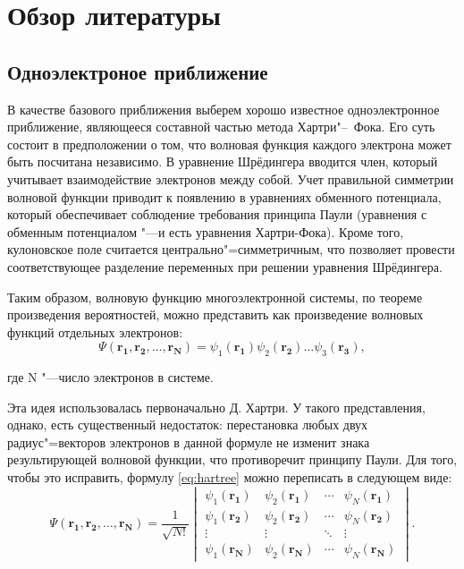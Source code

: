 \chapter{\textbf{Обзор литературы}}\label{ch:literature}
\section{\textbf{Одноэлектроное приближение}}
В качестве базового приближения выберем хорошо известное одноэлектронное приближение, являющееся составной частью
метода Хартри"--~Фока\cite{Hartree}. Его суть состоит в предположении о том, что волновая функция каждого электрона
может быть посчитана независимо.
В уравнение Шрёдингера вводится член, который учитывает взаимодействие электронов между
собой. Учет правильной симметрии волновой функции приводит к появлению в уравнениях
обменного потенциала, который обеспечивает соблюдение требования принципа Паули
(уравнения с обменным потенциалом "---и есть уравнения Хартри-Фока).
Кроме того, кулоновское поле считается центрально"=симметричным, что позволяет провести
соответствующее разделение переменных при решении уравнения Шрёдингера.

Таким образом, волновую функцию многоэлектронной системы, по теореме произведения вероятностей, можно представить как
произведение волновых функций отдельных электронов:
\begin{equation}\label{eq:hartree}
  \Psi(\mathbf{r_1}, \mathbf{r_2}, \dots, \mathbf{r_N}) =
  \psi_1(\mathbf{r_1}) \psi_2(\mathbf{r_2}) \dots \psi_3(\mathbf{r_3}),
\end{equation}

где N "---число электронов в системе.

Эта идея использовалась первоначально Д. Хартри.
У такого представления, однако, есть существенный недостаток: перестановка любых
двух радиус"=векторов электронов в данной формуле не изменит знака результирующей
волновой функции, что противоречит принципу Паули. Для того, чтобы это исправить,
формулу \eqref{eq:hartree} можно переписать в следующем виде\cite{Davidov}:
\begin{equation}\label{eq:fockWaveFunction}
  \Psi(\mathbf{r_1}, \mathbf{r_2}, \dots, \mathbf{r_N}) =
  \frac{1}{\sqrt{N!}}
  \begin{vmatrix}
    \psi_1(\mathbf{r_1}) & \psi_2(\mathbf{r_1}) & \cdots & \psi_N(\mathbf{r_1})\\
    \psi_1(\mathbf{r_2}) & \psi_2(\mathbf{r_2}) & \cdots & \psi_N(\mathbf{r_2})\\
    \vdots & \vdots & \ddots & \vdots\\
    \psi_1(\mathbf{r_N}) & \psi_2(\mathbf{r_N}) & \cdots & \psi_N(\mathbf{r_N})
  \end{vmatrix}.
\end{equation}

